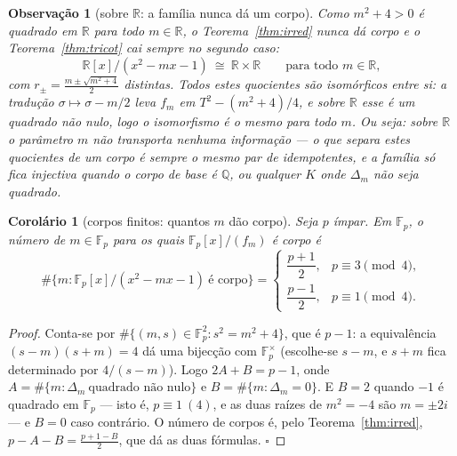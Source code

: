 \documentclass[11pt,a4paper]{article}
\newtheorem{corolario}{Corolário}
\newtheorem{observacao}{Observação}
\begin{document}
\begin{observacao}[sobre $\mathbb{R}$: a família nunca dá um corpo]\label{obs:metal-real}
Como $m^{2}+4>0$ é quadrado em $\mathbb{R}$ para todo $m\in\mathbb{R}$, o
Teorema~\ref{thm:irred} nunca dá corpo e o Teorema~\ref{thm:tricot} cai \emph{sempre} no
segundo caso:
\[
\boxed{
\mathbb{R}[x]/(x^{2}-mx-1)\ \cong\ \mathbb{R}\times\mathbb{R}
\qquad\text{para todo }m\in\mathbb{R},
}
\]
com $r_{\pm}=\tfrac{m\pm\sqrt{m^{2}+4}}{2}$ distintas. Todos estes quocientes são
isomórficos \emph{entre si}: a tradução $\sigma\mapsto\sigma-m/2$ leva $f_m$ em
$T^{2}-(m^{2}+4)/4$, e sobre $\mathbb{R}$ esse é um quadrado não nulo, logo o isomorfismo
é o mesmo para todo $m$. Ou seja: \emph{sobre $\mathbb{R}$ o parâmetro $m$ não transporta
nenhuma informação} --- o que separa estes quocientes de um corpo é sempre o mesmo par de
idempotentes, e a família só fica injectiva quando o corpo de base é $\mathbb{Q}$, ou
qualquer $K$ onde $\Delta_m$ não seja quadrado.
\end{observacao}

\begin{corolario}[corpos finitos: quantos $m$ dão corpo]\label{cor:metal-fp}
Seja $p$ ímpar. Em $\mathbb{F}_p$, o número de $m\in\mathbb{F}_p$ para os quais
$\mathbb{F}_p[x]/(f_m)$ é corpo é
\[
\boxed{
\#\{m:\mathbb{F}_p[x]/(x^{2}-mx-1)\ \text{é corpo}\}
=
\begin{cases}
\dfrac{p+1}{2}, & p\equiv3\!\!\!\pmod4,\\[0.6em]
\dfrac{p-1}{2}, & p\equiv1\!\!\!\pmod4.
\end{cases}}
\]
\end{corolario}

\begin{proof}
Conta-se por $\#\{(m,s)\in\mathbb{F}_p^{2}:s^{2}=m^{2}+4\}$, que é $p-1$: a equivalência
$(s-m)(s+m)=4$ dá uma bijecção com $\mathbb{F}_p^{\times}$ (escolhe-se $s-m$, e $s+m$
fica determinado por $4/(s-m)$). Logo $2A+B=p-1$, onde $A=\#\{m:\Delta_m\ \text{quadrado
não nulo}\}$ e $B=\#\{m:\Delta_m=0\}$. E $B=2$ quando $-1$ é quadrado em $\mathbb{F}_p$
--- isto é, $p\equiv1\ (4)$, e as duas raízes de $m^{2}=-4$ são $m=\pm2i$ --- e $B=0$
caso contrário. O número de corpos é, pelo Teorema~\ref{thm:irred}, $p-A-B=\tfrac{p+1-B}{2}$,
que dá as duas fórmulas. $\square$
\end{proof}
\end{document}
